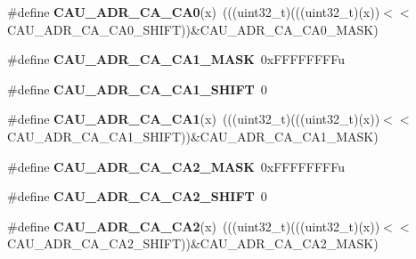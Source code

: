 \begin{DoxyCompactItemize}
\item 
\#define {\bfseries C\+A\+U\+\_\+\+A\+D\+R\+\_\+\+C\+A\+\_\+\+C\+A0}(x)~(((uint32\+\_\+t)(((uint32\+\_\+t)(x))$<$$<$C\+A\+U\+\_\+\+A\+D\+R\+\_\+\+C\+A\+\_\+\+C\+A0\+\_\+\+S\+H\+I\+FT))\&C\+A\+U\+\_\+\+A\+D\+R\+\_\+\+C\+A\+\_\+\+C\+A0\+\_\+\+M\+A\+SK)\hypertarget{group__CAU__Register__Masks_ga74e5e963432638577dc5004cf9ac7954}{}\label{group__CAU__Register__Masks_ga74e5e963432638577dc5004cf9ac7954}

\item 
\#define {\bfseries C\+A\+U\+\_\+\+A\+D\+R\+\_\+\+C\+A\+\_\+\+C\+A1\+\_\+\+M\+A\+SK}~0x\+F\+F\+F\+F\+F\+F\+F\+Fu\hypertarget{group__CAU__Register__Masks_gaa06ea4a2e4659354d7720c10f40f491c}{}\label{group__CAU__Register__Masks_gaa06ea4a2e4659354d7720c10f40f491c}

\item 
\#define {\bfseries C\+A\+U\+\_\+\+A\+D\+R\+\_\+\+C\+A\+\_\+\+C\+A1\+\_\+\+S\+H\+I\+FT}~0\hypertarget{group__CAU__Register__Masks_ga0627f84884a77f1e20570b01eacc50e8}{}\label{group__CAU__Register__Masks_ga0627f84884a77f1e20570b01eacc50e8}

\item 
\#define {\bfseries C\+A\+U\+\_\+\+A\+D\+R\+\_\+\+C\+A\+\_\+\+C\+A1}(x)~(((uint32\+\_\+t)(((uint32\+\_\+t)(x))$<$$<$C\+A\+U\+\_\+\+A\+D\+R\+\_\+\+C\+A\+\_\+\+C\+A1\+\_\+\+S\+H\+I\+FT))\&C\+A\+U\+\_\+\+A\+D\+R\+\_\+\+C\+A\+\_\+\+C\+A1\+\_\+\+M\+A\+SK)\hypertarget{group__CAU__Register__Masks_ga2383410eeb89d47fdb25e5e0d0d6049f}{}\label{group__CAU__Register__Masks_ga2383410eeb89d47fdb25e5e0d0d6049f}

\item 
\#define {\bfseries C\+A\+U\+\_\+\+A\+D\+R\+\_\+\+C\+A\+\_\+\+C\+A2\+\_\+\+M\+A\+SK}~0x\+F\+F\+F\+F\+F\+F\+F\+Fu\hypertarget{group__CAU__Register__Masks_ga9294c3d57841472174044b71a5a271ad}{}\label{group__CAU__Register__Masks_ga9294c3d57841472174044b71a5a271ad}

\item 
\#define {\bfseries C\+A\+U\+\_\+\+A\+D\+R\+\_\+\+C\+A\+\_\+\+C\+A2\+\_\+\+S\+H\+I\+FT}~0\hypertarget{group__CAU__Register__Masks_ga3809e21df053cc0fffe5518686527b59}{}\label{group__CAU__Register__Masks_ga3809e21df053cc0fffe5518686527b59}

\item 
\#define {\bfseries C\+A\+U\+\_\+\+A\+D\+R\+\_\+\+C\+A\+\_\+\+C\+A2}(x)~(((uint32\+\_\+t)(((uint32\+\_\+t)(x))$<$$<$C\+A\+U\+\_\+\+A\+D\+R\+\_\+\+C\+A\+\_\+\+C\+A2\+\_\+\+S\+H\+I\+FT))\&C\+A\+U\+\_\+\+A\+D\+R\+\_\+\+C\+A\+\_\+\+C\+A2\+\_\+\+M\+A\+SK)\hypertarget{group__CAU__Register__Masks_ga2e2a6bd48203a8f976196d023b1acec0}{}\label{group__CAU__Register__Masks_ga2e2a6bd48203a8f976196d023b1acec0}


\end{DoxyCompactItemize}
